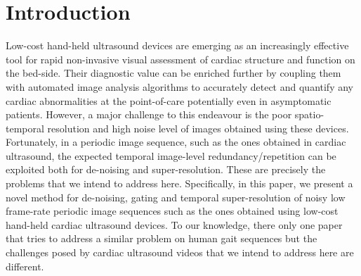 \documentclass[runningheads,a4paper]{llncs}
\begin{document}
\section{Introduction}
\label{sec:intro}
Low-cost hand-held ultrasound devices are emerging as an increasingly effective tool for rapid non-invasive visual assessment of cardiac structure and function on the bed-side\cite{Wiley2014}. Their diagnostic value can be enriched further by coupling them with automated image analysis algorithms to accurately detect and quantify any cardiac abnormalities at the point-of-care potentially even in asymptomatic patients. However, a major challenge to this endeavour is the poor spatio-temporal resolution and high noise level of images obtained using these devices. Fortunately, in a periodic image sequence, such as the ones obtained in cardiac ultrasound, the expected temporal image-level redundancy/repetition can be exploited both for de-noising and super-resolution. These are precisely the problems that we intend to address here. Specifically, in this paper, we present a novel method for de-noising, gating and temporal super-resolution of noisy low frame-rate periodic image sequences such as the ones obtained using low-cost hand-held cardiac ultrasound devices. To our knowledge, there only one paper \cite{Makihara2011} that tries to address a similar problem on human gait sequences but the challenges posed by cardiac ultrasound videos that we intend to address here are different.
\vspace{-0.5cm}
\end{document}
